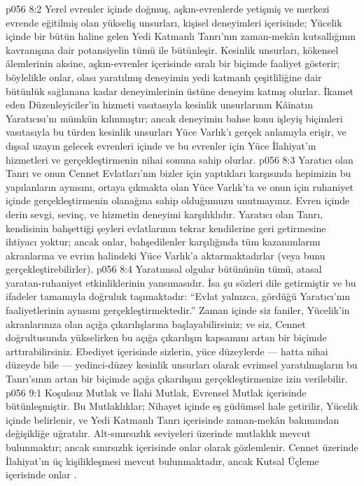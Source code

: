 \vs p056 8:2 Yerel evrenler içinde doğmuş, aşkın\hyp{}evrenlerde yetişmiş ve merkezi evrende eğitilmiş olan yükseliş unsurları, kişisel deneyimleri içerisinde; Yücelik içinde bir bütün haline gelen Yedi Katmanlı Tanrı’nın zaman\hyp{}mekân kutsallığının kavranışına dair potansiyelin tümü ile bütünleşir. Kesinlik unsurları, kökensel âlemlerinin aksine, aşkın\hyp{}evrenler içerisinde sıralı bir biçimde faaliyet gösterir; böylelikle onlar, olası yaratılmış deneyimin yedi katmanlı çeşitliliğine dair bütünlük sağlanana kadar deneyimlerinin üstüne deneyim katmış olurlar. İkamet eden Düzenleyiciler’in hizmeti vasıtasıyla kesinlik unsurlarının Kâinatın Yaratıcısı’nı  mümkün kılınmıştır; ancak deneyimin bahse konu işleyiş biçimleri vasıtasıyla bu türden kesinlik unsurları Yüce Varlık’ı gerçek anlamıyla  erişir, ve dışsal uzayın gelecek evrenleri içinde ve bu evrenler için Yüce İlahiyat’ın hizmetleri ve  gerçekleştirmenin nihai sonuna sahip olurlar.
\vs p056 8:3 Yaratıcı olan Tanrı ve onun Cennet Evlatları’nın bizler için yaptıkları karşısında hepimizin bu yapılanların aynısını, ortaya çıkmakta olan Yüce Varlık’ta ve onun için ruhaniyet içinde gerçekleştirmenin olanağına sahip olduğumuzu unutmayınız. Evren içinde derin sevgi, sevinç, ve hizmetin deneyimi karşılıklıdır. Yaratıcı olan Tanrı, kendisinin bahşettiği şeyleri evlatlarının tekrar kendilerine geri getirmesine ihtiyacı yoktur; ancak onlar, bahşedilenler karşılığında tüm kazanımlarını akranlarına ve evrim halindeki Yüce Varlık’a aktarmaktadırlar (veya bunu gerçekleştirebilirler).
\vs p056 8:4 Yaratımsal olgular bütününün tümü, atasal yaratan\hyp{}ruhaniyet etkinliklerinin yansımasıdır. İsa şu sözleri dile getirmiştir ve bu ifadeler tamamıyla doğruluk taşımaktadır: “Evlat yalnızca, gördüğü Yaratıcı’nın faaliyetlerinin aynısını gerçekleştirmektedir.” Zaman içinde siz faniler, Yücelik’in akranlarınıza olan açığa çıkarılışlarına başlayabilirsiniz; ve siz, Cennet doğrultusunda yükselirken bu açığa çıkarılışın kapsamını artan bir biçimde arttırabilirsiniz. Ebediyet içerisinde sizlerin, yüce düzeylerde --- hatta nihai düzeyde bile --- yedinci\hyp{}düzey kesinlik unsurları olarak evrimsel yaratılmışların bu Tanrı’sının artan bir biçimde açığa çıkarılışını gerçekleştirmenize izin verilebilir.
\vs p056 9:1 Koşulsuz Mutlak ve İlahi Mutlak, Evrensel Mutlak içerisinde bütünleşmiştir. Bu Mutlaklıklar; Nihayet içinde eş güdümsel hale getirilir, Yücelik içinde belirlenir, ve Yedi Katmanlı Tanrı içerisinde zaman\hyp{}mekân bakımından değişikliğe uğratılır. Alt\hyp{}sınırsızlık seviyeleri üzerinde  mutlaklık mevcut bulunmaktır; ancak sınırsızlık içerisinde onlar   olarak gözlemlenir. Cennet üzerinde İlahiyat’ın üç kişilikleşmesi mevcut bulunmaktadır, ancak Kutsal Üçleme içerisinde onlar .
